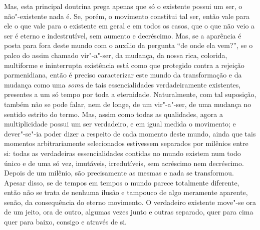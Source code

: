 Mas, esta principal doutrina prega apenas que só o existente possui um ser,
o não"-existente nada é. Se, porém, o movimento constitui tal ser, então
vale para ele o que vale para o existente em geral e em todos os casos, que o que
não veio a ser é eterno e indestrutível, sem aumento e decréscimo.
Mas, se a aparência é posta para fora deste mundo com o auxílio da
pergunta ``de onde ela vem?'', se o palco do assim chamado vir"-a"-ser, da
mudança, da nossa rica, colorida, multiforme e ininterrupta existência
está como que protegido contra a rejeição parmenidiana, então é preciso
caracterizar este mundo da transformação e da mudança como uma
\textit{soma} de tais essencialidades verdadeiramente existentes,
presentes a um só tempo por toda a eternidade. Naturalmente, com tal
suposição, também não se pode falar, nem de longe, de um vir"-a"-ser, de
uma mudança no sentido estrito do termo. Mas, assim como todas as
qualidades, agora a multiplicidade possui um ser verdadeiro, e em igual
medida o movimento; e dever"-se"-ia poder dizer a respeito de cada
momento deste mundo, ainda que tais momentos arbitrariamente
selecionados estivessem separados por milênios entre si: todas as
verdadeiras essencialidades contidas no mundo existem num todo único e
de uma só vez, imutáveis, irredutíveis, sem acréscimo nem decréscimo.
Depois de um milênio, são precisamente as mesmas e nada se transformou.
Apesar disso, se de tempos em tempos o mundo parece totalmente
diferente, então não se trata de nenhuma ilusão e tampouco de algo
meramente aparente, senão, da consequência do eterno movimento. O
verdadeiro existente move"-se ora de um jeito, ora de outro, algumas
vezes junto e outras separado, quer para cima quer para baixo, consigo
e através de si.

\sectionitem

